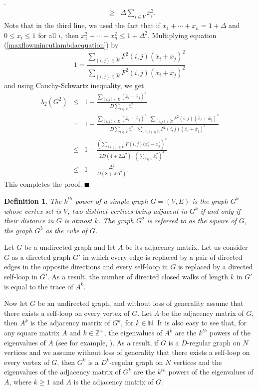 \documentclass{article}
\newtheorem{definition}[theorem]{Definition}
\newcommand{\bproof}{\noindent{\bf Proof}}
\newcommand{\eproof}{\hspace*{\fill}$\rule{2mm}{2mm}$~~~~\bigskip}
\renewenvironment{proof}{\bproof. }{\eproof}
\newcommand{\Z}{\mathbb{Z}}
\newcommand{\N}{\mathbb{N}}
\begin{document}
\begin{proof}
\begin{eqnarray*}
 & \geq & \Delta\sum_{i\in V}\overline{x}_i^2.
\end{eqnarray*}
Note that in the third line, we used the fact that if $x_1+\cdots +x_n=1+\Delta$ and $0\leq x_i\leq 1$ for all $i$, then $x_1^2+\cdots +x_n^2\leq 1+\Delta ^2$. Multiplying equation (\ref{maxflowmincutlambdaequation}) by
\[
1=\frac{\sum_{(i,j)\in\tilde{E}}F^2(i,j)(\overline{x}_i+\overline{x}_j)^2}{\sum_{(i,j)\in\tilde{E}}F^2(i,j)(\overline{x}_i+\overline{x}_j)^2}
\]
and using Cauchy-Schwartz inequality, we get
\begin{eqnarray*}
\lambda_2(G^2) & \leq & 1-\frac{\sum_{(i,j)\in E}(\overline{x}_i-\overline{x}_j)^2}{D\sum_{i\in V}\overline{x}_i^2}\\
 & = & 1-\frac{\sum_{(i,j)\in E}(\overline{x}_i-\overline{x}_j)^2\cdot\sum_{(i,j)\in\tilde{E}}F^2(i,j)(\overline{x}_i+\overline{x}_j)^2}{D\sum_{i\in V}\overline{x}_i^2\cdot\sum_{(i,j)\in\tilde{E}}F^2(i,j)(\overline{x}_i+\overline{x}_j)^2}\\
 & \leq & 1-\frac{\left (\sum_{(i,j)\in\tilde{E}}F(i,j)(\overline{x}_i^2-\overline{x}_j^2\right )^2}{2D(4+2\Delta^2)\cdot\left (\sum_{i\in V}\overline{x}_i^2\right )^2}\\
 & \leq & 1-\frac{\Delta^2}{D(8+4\Delta^2)}.
\end{eqnarray*}
This completes the proof.
\end{proof}

\begin{definition}\label{powering}{\rm \cite[pp. 82]{BM2008}}
The $k^{th}$ power of a simple graph $G=(V,E)$ is the graph $G^k$ whose vertex set is $V$, two distinct vertices being adjacent in $G^k$ if and only if their distance in $G$ is atmost $k$. The graph $G^2$ is referred to as the square of $G$, the graph $G^3$ as the cube of $G$.
\end{definition}
Let $G$ be a undirected graph and let $A$ be its adjacency matrix. Let us consider $G$ as a directed graph $G'$ in which every edge is replaced by a pair of directed edges in the opposite directions and every self-loop in $G$ is replaced by a directed self-loop in $G'$. As a result, the number of directed closed walks of length $k$ in $G'$ is equal to the trace of $A^k$.

Now let $G$ be an undirected graph, and without loss of generality assume that there exists a self-loop on every vertex of $G$. Let $A$ be the adjacency matrix of $G$, then $A^k$ is the adjacency matrix of $G^k$, for $k\in\N$. It is also easy to see that, for any square matrix $A$ and $k\in\Z^+$, the eigenvalues of $A^k$ are the $k^{th}$ powers of the eigenvalues of $A$ (see for example, \cite[Section 5.2]{Str2006}). As a result, if $G$ is a $D$-regular graph on $N$ vertices and we assume without loss of generality that there exists a self-loop on every vertex of $G$, then $G^k$ is a $D^k$-regular graph on $N$ vertices and the eigenvalues of the adjacency matrix of $G^k$ are the $k^{th}$ powers of the eigenvalues of $A$, where $k\geq 1$ and $A$ is the adjacency matrix of $G$.
\end{document}
